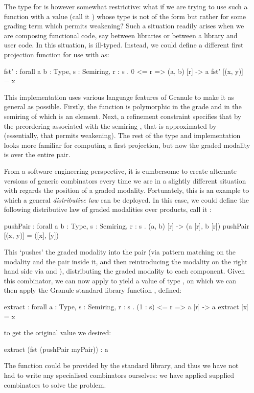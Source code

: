 The type for  is however somewhat restrictive: what if
we are trying to use such a function with a value (call it
) whose type is not
of the form  but rather  for
some grading term  which permits weakening? Such a situation
readily arises when we are composing functional code, say between
libraries or between a library and user code. In this situation,
 is ill-typed. Instead, we could define a
different first projection function for use with  as:
%
\begin{granule}
fst' : forall {a b : Type, s : Semiring, r : s} 
     . {0 <= r} => (a, b) [r] -> a
fst' [(x, y)] = x
\end{granule}
%
This implementation uses various language features of Granule to make
it as general as possible. Firstly, the function is polymorphic
in the grade  and in the semiring  of which 
is an element. Next, a refinement constraint  specifies
that by the preordering \granin{<=} associated with the semiring
, that  is approximated by 
(essentially, that  permits weakening). The rest
of the type and implementation looks more familiar for computing
a first projection, but now the graded
modality is over the entire pair.

From a software engineering perspective, it is cumbersome to
create alternate versions of generic combinators every time we are
in a slightly different situation with regards the position of a
graded modality.  Fortunately, this is an example to which a
general \emph{distributive law} can be deployed. In this case,
we could define the following distributive law of graded modalities over
products, call it :
%
\begin{granule}
pushPair : forall {a b : Type, s : Semiring, r : s} 
         . (a, b) [r] -> (a [r], b [r])
pushPair [(x, y)] = ([x], [y])
\end{granule}
%
This `pushes' the graded modality  into
the pair (via pattern matching on the modality and the pair inside it, and then
reintroducing the modality on the right hand side via \granin{[x]} and
\granin{[y]}), distributing the graded modality to each component.
Given this combinator, we can now apply  to yield a value of
type , on which we can then apply the Granule standard library
function , defined:
\begin{granule}
extract : forall {a : Type, s : Semiring, r : s}
        . {(1 : s) <= r} => a [r] -> a
extract [x] = x
\end{granule}
 to get the original  value we desired:
%
\begin{granule}
extract (fst (pushPair myPair)) : a
\end{granule}
%
The  function could be provided by the standard
library, and thus we have not had to write any specialised combinators
ourselves: we have applied supplied combinators to solve the problem.

